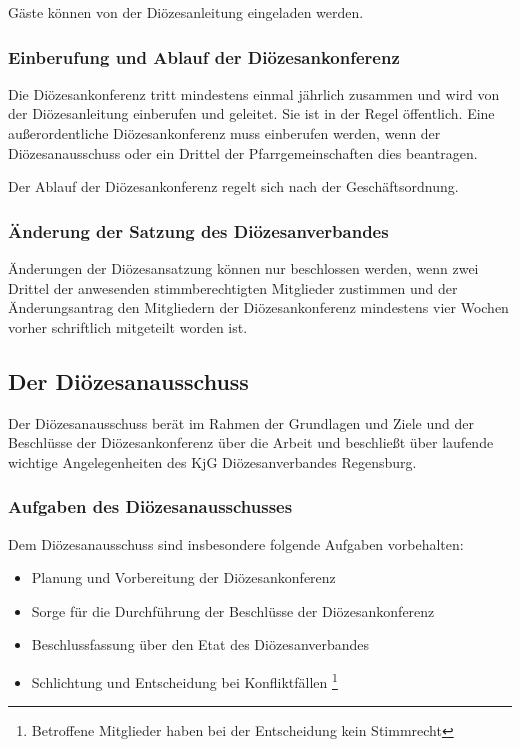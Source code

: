 \documentclass[12pt]{report}
\begin{document}
\begin{flushleft}
Gäste können von der Diözesanleitung eingeladen werden.
\subsubsection{Einberufung und Ablauf der Diözesankonferenz}
Die Diözesankonferenz tritt mindestens einmal jährlich zusammen und wird von der Diözesanleitung
einberufen und geleitet. Sie ist in der Regel öffentlich.
Eine außerordentliche Diözesankonferenz muss einberufen werden, wenn der Diözesanausschuss oder ein
Drittel der Pfarrgemeinschaften dies beantragen.

Der Ablauf der Diözesankonferenz regelt sich nach der Geschäftsordnung.

\subsubsection{Änderung der Satzung des Diözesanverbandes}
Änderungen der Diözesansatzung können nur beschlossen werden, wenn zwei Drittel der anwesenden
stimmberechtigten Mitglieder zustimmen und der Änderungsantrag den Mitgliedern der
Diözesankonferenz mindestens vier Wochen vorher schriftlich mitgeteilt worden ist.

\subsection{Der Diözesanausschuss}
Der Diözesanausschuss berät im Rahmen der Grundlagen und Ziele und der Beschlüsse der Diözesankonferenz
über die Arbeit und beschließt über laufende wichtige Angelegenheiten des KjG Diözesanverbandes Regensburg.

\subsubsection{Aufgaben des Diözesanausschusses}
Dem Diözesanausschuss sind insbesondere folgende Aufgaben vorbehalten:
\begin{itemize}
  \item Planung und Vorbereitung der Diözesankonferenz
  \item Sorge für die Durchführung der Beschlüsse der Diözesankonferenz
  \item Beschlussfassung über den Etat des Diözesanverbandes
  \item Schlichtung und Entscheidung bei Konfliktfällen
        \footnote{Betroffene Mitglieder haben bei der Entscheidung kein Stimmrecht}
\end{itemize}


\end{flushleft}
\end{document}

